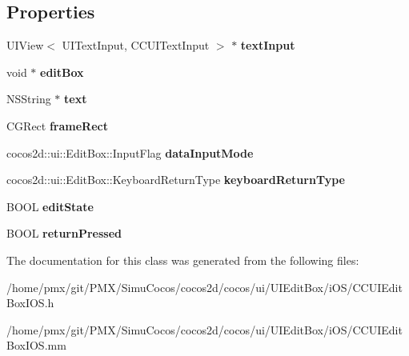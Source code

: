 \subsection*{Properties}
\begin{DoxyCompactItemize}
\item 
\mbox{\label{interfaceUIEditBoxImplIOS__objc_a110e4a2cd4d08086dcc887238cc70e1b}} 
U\+I\+View$<$ U\+I\+Text\+Input, C\+C\+U\+I\+Text\+Input $>$ $\ast$ {\bfseries text\+Input}
\item 
\mbox{\label{interfaceUIEditBoxImplIOS__objc_a1c0d5257e13780b239e4b742d517f177}} 
void $\ast$ {\bfseries edit\+Box}
\item 
\mbox{\label{interfaceUIEditBoxImplIOS__objc_a6125fe6ad70523bc974df0f823d0c457}} 
N\+S\+String $\ast$ {\bfseries text}
\item 
\mbox{\label{interfaceUIEditBoxImplIOS__objc_a39cc748c85795a68f468d02246d61d88}} 
C\+G\+Rect {\bfseries frame\+Rect}
\item 
\mbox{\label{interfaceUIEditBoxImplIOS__objc_ae22db844d7a83996367319ea0f7b18da}} 
cocos2d\+::ui\+::\+Edit\+Box\+::\+Input\+Flag {\bfseries data\+Input\+Mode}
\item 
\mbox{\label{interfaceUIEditBoxImplIOS__objc_a29ca435ea4296320a3cfb0f08e466a0e}} 
cocos2d\+::ui\+::\+Edit\+Box\+::\+Keyboard\+Return\+Type {\bfseries keyboard\+Return\+Type}
\item 
\mbox{\label{interfaceUIEditBoxImplIOS__objc_a100f33d7ea06f09f5ff17437fe26eb84}} 
B\+O\+OL {\bfseries edit\+State}
\item 
\mbox{\label{interfaceUIEditBoxImplIOS__objc_aa0a07a828041cf6bb078aa53be6658dc}} 
B\+O\+OL {\bfseries return\+Pressed}
\end{DoxyCompactItemize}


The documentation for this class was generated from the following files\+:\begin{DoxyCompactItemize}
\item 
/home/pmx/git/\+P\+M\+X/\+Simu\+Cocos/cocos2d/cocos/ui/\+U\+I\+Edit\+Box/i\+O\+S/C\+C\+U\+I\+Edit\+Box\+I\+O\+S.\+h\item 
/home/pmx/git/\+P\+M\+X/\+Simu\+Cocos/cocos2d/cocos/ui/\+U\+I\+Edit\+Box/i\+O\+S/C\+C\+U\+I\+Edit\+Box\+I\+O\+S.\+mm\end{DoxyCompactItemize}
